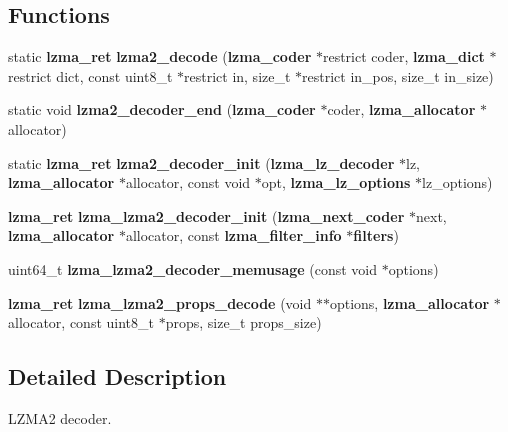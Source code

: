 \subsection*{Functions}
\begin{DoxyCompactItemize}
\item 
static {\bf lzma\-\_\-ret} {\bfseries lzma2\-\_\-decode} ({\bf lzma\-\_\-coder} $\ast$restrict coder, {\bf lzma\-\_\-dict} $\ast$restrict dict, const uint8\-\_\-t $\ast$restrict in, size\-\_\-t $\ast$restrict in\-\_\-pos, size\-\_\-t in\-\_\-size)\label{lzma2__decoder_8c_a34152efb5c942f168b9889e1b2bfd34e}

\item 
static void {\bfseries lzma2\-\_\-decoder\-\_\-end} ({\bf lzma\-\_\-coder} $\ast$coder, {\bf lzma\-\_\-allocator} $\ast$allocator)\label{lzma2__decoder_8c_a9d6c52660b4ae4e98681be9956bf8303}

\item 
static {\bf lzma\-\_\-ret} {\bfseries lzma2\-\_\-decoder\-\_\-init} ({\bf lzma\-\_\-lz\-\_\-decoder} $\ast$lz, {\bf lzma\-\_\-allocator} $\ast$allocator, const void $\ast$opt, {\bf lzma\-\_\-lz\-\_\-options} $\ast$lz\-\_\-options)\label{lzma2__decoder_8c_af5bb105e2f324b919c40111a64d29854}

\item 
{\bf lzma\-\_\-ret} {\bfseries lzma\-\_\-lzma2\-\_\-decoder\-\_\-init} ({\bf lzma\-\_\-next\-\_\-coder} $\ast$next, {\bf lzma\-\_\-allocator} $\ast$allocator, const {\bf lzma\-\_\-filter\-\_\-info} $\ast${\bf filters})\label{lzma2__decoder_8c_a9f69ff763aa8af96210c6ff7a8e5c24b}

\item 
uint64\-\_\-t {\bfseries lzma\-\_\-lzma2\-\_\-decoder\-\_\-memusage} (const void $\ast$options)\label{lzma2__decoder_8c_a1c1e1c878fab104400c9917efc2e2e1c}

\item 
{\bf lzma\-\_\-ret} {\bfseries lzma\-\_\-lzma2\-\_\-props\-\_\-decode} (void $\ast$$\ast$options, {\bf lzma\-\_\-allocator} $\ast$allocator, const uint8\-\_\-t $\ast$props, size\-\_\-t props\-\_\-size)\label{lzma2__decoder_8c_a425d290efc30c370f99e6106280836d0}

\end{DoxyCompactItemize}


\subsection{Detailed Description}
L\-Z\-M\-A2 decoder. 
